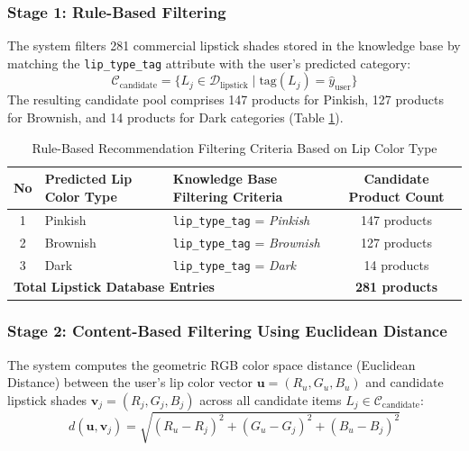 \documentclass[10pt,a4paper]{article}
\begin{document}
\subsubsection{Stage 1: Rule-Based Filtering}
The system filters 281 commercial lipstick shades stored in the knowledge base by matching the \texttt{lip\_type\_tag} attribute with the user's predicted category:
\begin{equation}
  \mathcal{C}_{\text{candidate}} = \{ L_j \in \mathcal{D}_{\text{lipstick}} \mid \text{tag}(L_j) = \hat{y}_{\text{user}} \}
\end{equation}
The resulting candidate pool comprises 147 products for Pinkish, 127 products for Brownish, and 14 products for Dark categories (Table \ref{tab:rule_based}).

\begin{table}[htbp]
  \centering
  \caption{Rule-Based Recommendation Filtering Criteria Based on Lip Color Type}
  \label{tab:rule_based}
  \fontsize{8.5pt}{11pt}\selectfont
  \begin{tabular}{cllc}
    \toprule
    \textbf{No} & \textbf{Predicted Lip Color Type} & \textbf{Knowledge Base Filtering Criteria} & \textbf{Candidate Product Count} \\
    \midrule
    1 & Pinkish  & \texttt{lip\_type\_tag} = \textit{Pinkish}  & 147 products \\
    2 & Brownish & \texttt{lip\_type\_tag} = \textit{Brownish} & 127 products \\
    3 & Dark     & \texttt{lip\_type\_tag} = \textit{Dark}     & 14 products \\
    \midrule
    \multicolumn{3}{l}{\textbf{Total Lipstick Database Entries}} & \textbf{281 products} \\
    \bottomrule
  \end{tabular}
\end{table}

\subsubsection{Stage 2: Content-Based Filtering Using Euclidean Distance}
The system computes the geometric RGB color space distance (Euclidean Distance) between the user's lip color vector $\mathbf{u} = (R_u, G_u, B_u)$ and candidate lipstick shades $\mathbf{v}_j = (R_j, G_j, B_j)$ across all candidate items $L_j \in \mathcal{C}_{\text{candidate}}$:
\begin{equation}
  d(\mathbf{u}, \mathbf{v}_j) = \sqrt{(R_u - R_j)^2 + (G_u - G_j)^2 + (B_u - B_j)^2}
  \label{eq:euclidean}
\end{equation}
\end{document}
